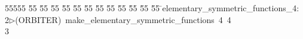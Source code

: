 %
%
\begin{tabbing}
55555 \= 55 \= 55 \= 55 \= 55 \= 55 \= 55 \= 55 \= 55 \= 55 \= 55 \= 55 \= 55 \= \>elementary\_symmetric\_functions\_4:\\[0pt]
2\>$\triangleright$\>(ORBITER)\ make\_elementary\_symmetric\_functions\ 4\ 4\\[0pt]
3\>\end{tabbing}
